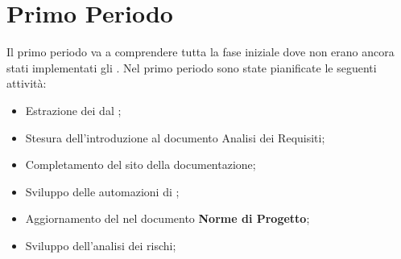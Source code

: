 \section{Primo Periodo}

\label{sec:PrimoPeriodo}
Il primo periodo va a comprendere tutta la fase iniziale dove non erano ancora stati implementati gli .
Nel primo periodo sono state pianificate le seguenti attività:
\begin{itemize}
    \item Estrazione dei  dal ;
    \item Stesura dell'introduzione al documento Analisi dei Requisiti;
    \item Completamento del sito della documentazione;
    \item Sviluppo delle automazioni di ; 
    \item Aggiornamento del \textbf{} nel documento \textbf{Norme di Progetto};
    \item Sviluppo dell'analisi dei rischi;
\end{itemize}




